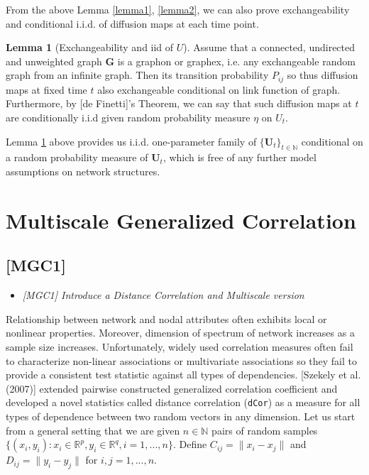 \documentclass[12pt]{article}
\theoremstyle{definition}
\newtheorem{lemma}[theorem]{Lemma}
\begin{document}
From the above Lemma \ref{lemma1}, \ref{lemma2}, we can also prove exchangeability and conditional i.i.d. of diffusion maps at each time point. 

\begin{lemma}[Exchangeability and iid of $U$]
	\label{lemma3}
Assume that a connected, undirected and unweighted graph $\mathbf{G}$ is a graphon or graphex, i.e. any exchangeable random graph from an infinite graph. Then its transition probability $P_{ij}$ so thus  diffusion maps at fixed time $t$ also exchangeable conditional on link function of graph. Furthermore, by [de Finetti]'s Theorem, we can say that such diffusion maps at $t$ are conditionally i.i.d given random probability measure $\eta$ on $U_{t}$.    
\end{lemma}


Lemma \ref{lemma3} above provides us i.i.d. one-parameter family of $\{ \mathbf{U}_{t} \}_{t \in \mathbb{N}}$ conditional on a random probability measure of $\mathbf{U}_{t}$, which is free of any further model assumptions on network structures.   


\newpage
\section{Multiscale Generalized Correlation}

\subsection{[MGC1]}
\begin{itemize}
	\item {\it  [MGC1] Introduce a Distance Correlation and Multiscale version\/}
\end{itemize}

Relationship between network and nodal attributes often exhibits local or nonlinear properties. Moreover, dimension of spectrum of network increases as a sample size increases. Unfortunately, widely used correlation measures often fail to characterize non-linear associations or multivariate associations so they fail to provide a consistent test statistic against all types of dependencies. [Szekely et al. (2007)] extended pairwise constructed generalized correlation coefficient and developed a novel statistics called distance correlation (\texttt{dCor}) as a measure for all types of dependence between two random vectors in any dimension. Let us start from a general setting that we are given $n \in \mathbb{N}$ pairs of random samples $\{ (x_{i}, y_{i}) : x_{i} \in \mathbb{R}^{p}, y_{i} \in \mathbb{R}^{q}, i = 1,...,n \}$. Define $C_{ij} = \parallel x_{i} - x_{j} \parallel$ and $D_{ij} = \parallel y_{i} - y_{j} \parallel$ for $i,j=1,...,n$. 
	 
\end{document}
